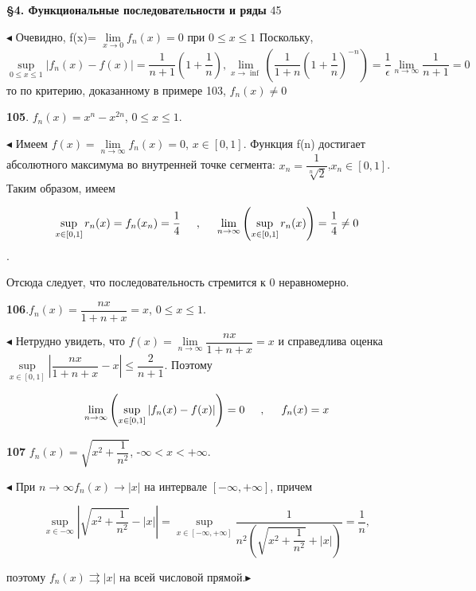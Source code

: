 \documentclass[a4paper, 12pt]{article}
\begin{document}
\begin{center}
\textbf{\textbf{{\S4. Функциональные последовательности и ряды}}} \hspace{2.5cm}45
\end{center}
$\blacktriangleleft$ Очевидно, f(x)=
$\lim\limits_{x\to 0}f_{n}(x)=0$ при $ 0 \leqslant x \leqslant 1$ Поскольку,
\[\sup\limits_{0 \leqslant x \leqslant 1} |f_n(x) - f(x)| = \dfrac{1}{n+1}\left(1+\frac{1}{n} \right) , \lim\limits_{x\to \inf}\left(\dfrac{1}{1+n}\left(1 + \dfrac{1}{n}\right)^{-n} \right)=\dfrac{1}{\epsilon} \lim\limits_{n \to \infty}\dfrac{1}{n+1}=0 \] 
то по критерию, доказанному в примере 103, $f_n(x) \neq 0$

\textbf{105}. $f_n(x)=x^n-x^{2n}$, $0 \leqslant x \leqslant 1$.
\begin{spacing}{1.5}
$\blacktriangleleft$ Имеем $f(x)=\lim\limits_{n \to \infty} f_n(x)=0$, $x\in [0,1]$. Функция f(n) достигает абсолютного максимума во внутренней точке сегмента: $x_n=\dfrac{1}{\sqrt[n]{2}}$,$x_n\in[0,1]$. Таким образом, имеем
\end{spacing}
\[\sup\limits_{x\in[0,1]}r_n(x)=f_n(x_n)=\dfrac{1}{4}\hspace{0.5cm},\hspace{0.5cm} \lim\limits_{n \to \infty} \left(\sup\limits_{x\in[0,1]}r_n(x) \right) = \dfrac{1}{4}\neq 0\].

Отсюда следует, что последовательность стремится к 0 неравномерно.

\textbf{106}.$f_n(x)=\dfrac{nx}{1+n+x}=x$, $ 0\leqslant x \leqslant 1$.

$ \blacktriangleleft $ Нетрудно увидеть, что $f(x)=\lim\limits_{n\to \infty}\dfrac{nx}{1+n+x}=x$ и справедлива оценка $\sup\limits_{x\in[0,1]}\left|\dfrac{nx}{1+n+x}-x\right|\leqslant\dfrac{2}{n+1}$. Поэтому 

\[\lim\limits_{n\to \infty}\left(\sup\limits_{x\in[0,1]}|f_n(x)-f(x)|\right)=0\hspace{0.5cm},\hspace{0.5cm} f_n(x)=x \]

\textbf{107} $f_n(x) = \sqrt{x^2+\dfrac{1}{n^2}}$, -$\infty < x < +\infty$.

$\blacktriangleleft$ При $n \to \infty f_n(x) \to |x|$ на интервале $[-\infty, +\infty]$, причем 

\[\sup\limits_{x\in -\infty}\left|\sqrt{x^2 + \dfrac{1}{n^2}}-|x|\right|=\sup\limits_{x\in [-\infty, +\infty]}\dfrac{1}{n^2\left(\sqrt{x^2+\dfrac{1}{n^2}}+|x|\right)}=\dfrac{1}{n} ,\]

поэтому $f_n(x)\rightrightarrows |x|$ на всей числовой прямой.$\blacktriangleright$
\end{document}
